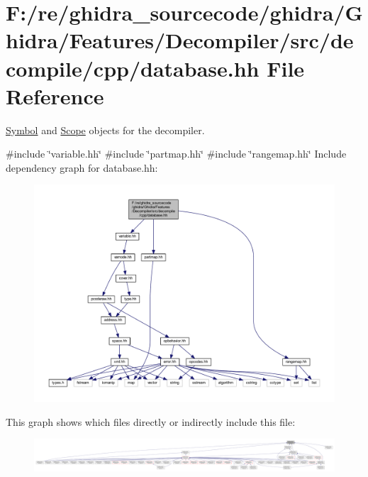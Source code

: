 \hypertarget{database_8hh}{}\section{F\+:/re/ghidra\+\_\+sourcecode/ghidra/\+Ghidra/\+Features/\+Decompiler/src/decompile/cpp/database.hh File Reference}
\label{database_8hh}


\mbox{\hyperlink{class_symbol}{Symbol}} and \mbox{\hyperlink{class_scope}{Scope}} objects for the decompiler.  


{\ttfamily \#include \char`\"{}variable.\+hh\char`\"{}}\newline
{\ttfamily \#include \char`\"{}partmap.\+hh\char`\"{}}\newline
{\ttfamily \#include \char`\"{}rangemap.\+hh\char`\"{}}\newline
Include dependency graph for database.\+hh\+:
\nopagebreak
\begin{figure}[H]
\begin{center}
\leavevmode
\includegraphics[width=350pt]{database_8hh__incl}
\end{center}
\end{figure}
This graph shows which files directly or indirectly include this file\+:
\nopagebreak
\begin{figure}[H]
\begin{center}
\leavevmode
\includegraphics[width=350pt]{database_8hh__dep__incl}
\end{center}
\end{figure}
